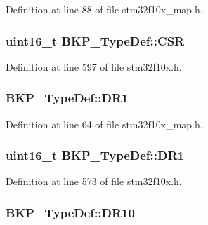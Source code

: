 Definition at line 88 of file stm32f10x\+\_\+map.\+h.

\subsubsection[{\texorpdfstring{C\+SR}{CSR}}]{ {\bf uint16\+\_\+t} B\+K\+P\+\_\+\+Type\+Def\+::\+C\+SR}\hypertarget{struct_b_k_p___type_def_a8edc0ddaac3db876f8d3ddee902bc610}{}\label{struct_b_k_p___type_def_a8edc0ddaac3db876f8d3ddee902bc610}


Definition at line 597 of file stm32f10x.\+h.

\subsubsection[{\texorpdfstring{D\+R1}{DR1}}]{ B\+K\+P\+\_\+\+Type\+Def\+::\+D\+R1}\hypertarget{struct_b_k_p___type_def_a7f5659ec729bb18121ce846e56f5cdfb}{}\label{struct_b_k_p___type_def_a7f5659ec729bb18121ce846e56f5cdfb}


Definition at line 64 of file stm32f10x\+\_\+map.\+h.

\subsubsection[{\texorpdfstring{D\+R1}{DR1}}]{ {\bf uint16\+\_\+t} B\+K\+P\+\_\+\+Type\+Def\+::\+D\+R1}\hypertarget{struct_b_k_p___type_def_aaa1a907c0aaf85c6de3aa3d829a07a3a}{}\label{struct_b_k_p___type_def_aaa1a907c0aaf85c6de3aa3d829a07a3a}


Definition at line 573 of file stm32f10x.\+h.

\subsubsection[{\texorpdfstring{D\+R10}{DR10}}]{ B\+K\+P\+\_\+\+Type\+Def\+::\+D\+R10}\hypertarget{struct_b_k_p___type_def_a76b7828793fbf010d0188d2b9f789122}{}\label{struct_b_k_p___type_def_a76b7828793fbf010d0188d2b9f789122}


